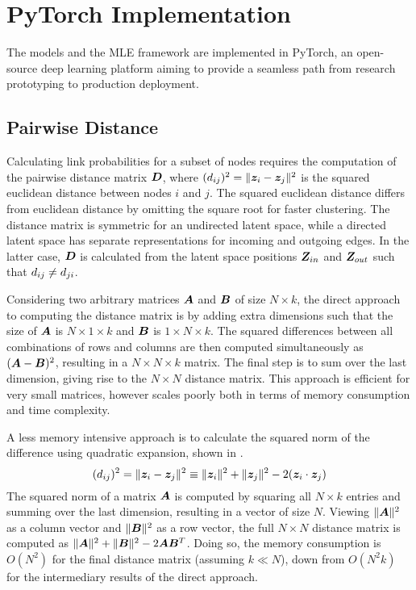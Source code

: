 \section{PyTorch Implementation}

The models and the MLE framework are implemented in PyTorch, an open-source deep learning platform aiming to provide a seamless path from research prototyping to production deployment. %

\subsection{Pairwise Distance}

    Calculating link probabilities for a subset of nodes requires the computation of the pairwise distance matrix $\bm{D}$, where $(\sub(d))^2=\Vert \z_i-\z_j\Vert^2$ is the squared euclidean distance between nodes $i$ and $j$. The squared euclidean distance differs from euclidean distance by omitting the square root for faster clustering. The distance matrix is symmetric for an undirected latent space, while a directed latent space has separate representations for incoming and outgoing edges. In the latter case, $\bm{D}$ is calculated from the latent space positions $\bm{Z}_{in}$ and $\bm{Z}_{out}$ such that $\sub(d)\neq\sub(d)(ji)$.
    
    Considering two arbitrary matrices $\bm{A}$ and $\bm{B}$ of size $N\times k$, the direct approach to computing the distance matrix is by adding extra dimensions such that the size of $\bm{A}$ is $N\times 1\times k$ and $\bm{B}$ is $1\times N\times k$. The squared differences between all combinations of rows and columns are then computed simultaneously as $(\bm{A}-\bm{B})^2$, resulting in a $N\times N\times k$ matrix. The final step is to sum over the last dimension, giving rise to the $N\times N$ distance matrix. This approach is efficient for very small matrices, however scales poorly both in terms of memory consumption and time complexity.
    
    A less memory intensive approach is to calculate the squared norm of the difference using quadratic expansion, shown in .
    \begin{equation}\label{eq:pyimpl-dist-quadratic}
        (\sub(d))^2=\Vert\z_i-\z_j\Vert^2\equiv\Vert \z_i\Vert^2 + \Vert\z_j\Vert^2 - 2(\z_i\cdot\z_j)
    \end{equation}
    The squared norm of a matrix $\bm{A}$ is computed by squaring all $N\times k$ entries and summing over the last dimension, resulting in a vector of size $N$. Viewing $\Vert\bm{A}\Vert^2$ as a column vector and $\Vert\bm{B}\Vert^2$ as a row vector, the full $N\times N$ distance matrix is computed as $\Vert\bm{A}\Vert^2 + \Vert \bm{B}\Vert^2 - 2\bm{A}\bm{B}^T$. Doing so, the memory consumption is $O(N^2)$ for the final distance matrix (assuming $k\ll N$), down from $O(N^2k)$ for the intermediary results of the direct approach.
    
